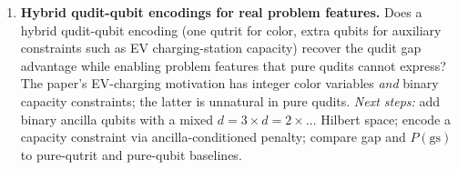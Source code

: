 \begin{enumerate}
\item \textbf{Hybrid qudit-qubit encodings for real problem features.}
Does a hybrid qudit-qubit encoding (one qutrit for color, extra qubits
for auxiliary constraints such as EV charging-station capacity)
recover the qudit gap advantage while enabling problem features that
pure qudits cannot express? The paper's EV-charging motivation has
integer color variables \emph{and} binary capacity constraints; the
latter is unnatural in pure qudits. \emph{Next steps:} add binary
ancilla qubits with a mixed $d{=}3\times d{=}2\times\dots$ Hilbert
space; encode a capacity constraint via ancilla-conditioned penalty;
compare gap and $P(\text{gs})$ to pure-qutrit and pure-qubit baselines.
\end{enumerate}
